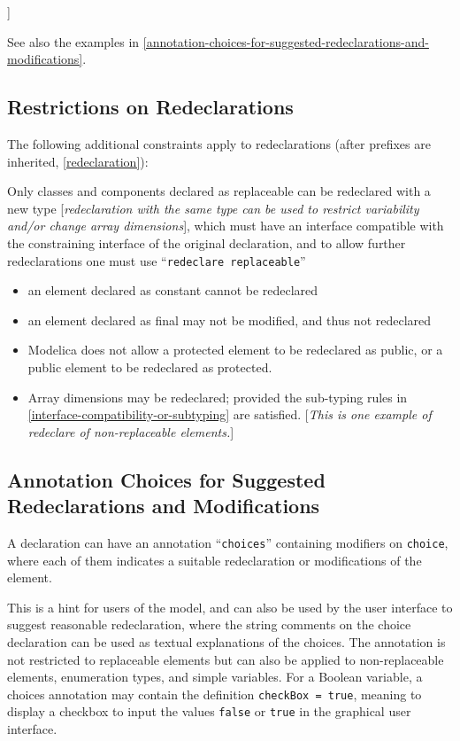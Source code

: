 {]}

See also the examples in \autoref{annotation-choices-for-suggested-redeclarations-and-modifications}.

\subsection{Restrictions on Redeclarations}

The following additional constraints apply to redeclarations (after
prefixes are inherited, \autoref{redeclaration}):

Only classes and components declared as replaceable can be redeclared
with a new type {[}\emph{redeclaration with the same type can be used to
restrict variability and/or change array dimensions}{]}, which must have
an interface compatible with the constraining interface of the original
declaration, and to allow further redeclarations one must use
``\lstinline[basicstyle=\ttfamily]!redeclare replaceable!''

\begin{itemize}
\item
  an element declared as constant cannot be redeclared
\item
  an element declared as final may not be modified, and thus not
  redeclared
\item
  Modelica does not allow a protected element to be redeclared as
  public, or a public element to be redeclared as protected.
\item
  Array dimensions may be redeclared; provided the sub-typing rules in
  \autoref{interface-compatibility-or-subtyping} are satisfied. {[}\emph{This is one example of redeclare of
  non-replaceable elements.}{]}
\end{itemize}

\subsection{Annotation Choices for Suggested Redeclarations and Modifications}

A declaration can have an annotation ``\lstinline[basicstyle=\ttfamily]!choices!'' containing modifiers on
\lstinline[basicstyle=\ttfamily]!choice!, where each of them indicates a suitable redeclaration or
modifications of the element.

This is a hint for users of the model, and can also be used by the user
interface to suggest reasonable redeclaration, where the string comments
on the choice declaration can be used as textual explanations of the
choices. The annotation is not restricted to replaceable elements but
can also be applied to non-replaceable elements, enumeration types, and
simple variables. For a Boolean variable, a choices annotation may
contain the definition \lstinline[basicstyle=\ttfamily]!checkBox = true!, meaning to display a checkbox to
input the values \lstinline[basicstyle=\ttfamily]!false! or \lstinline[basicstyle=\ttfamily]!true! in the graphical user interface.


